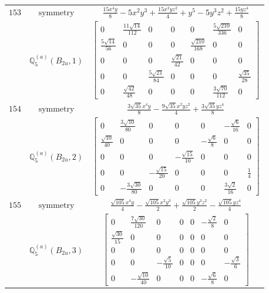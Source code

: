 \documentclass[fleqn,8pt,landscape]{jsarticle}
\begin{document}
\begin{longtable}{ccc}
$ 153 $ & $ \text{symmetry} $ & $ \frac{15 x^{4} y}{8} - 5 x^{2} y^{3} + \frac{15 x^{2} y z^{2}}{4} + y^{5} - 5 y^{3} z^{2} + \frac{15 y z^{4}}{8} $ \\
$  $ & $ \mathbb{Q}_{5}^{(a)}(B_{2u},1) $ & $ \begin{bmatrix} 0 & \frac{11 \sqrt{14}}{112} & 0 & 0 & 0 & \frac{5 \sqrt{210}}{336} & 0 \\ \frac{5 \sqrt{14}}{56} & 0 & 0 & 0 & \frac{\sqrt{210}}{168} & 0 & 0 \\ 0 & 0 & 0 & \frac{\sqrt{21}}{42} & 0 & 0 & 0 \\ 0 & 0 & \frac{5 \sqrt{21}}{84} & 0 & 0 & 0 & \frac{\sqrt{35}}{28} \\ 0 & \frac{\sqrt{42}}{48} & 0 & 0 & 0 & \frac{3 \sqrt{70}}{112} & 0 \end{bmatrix} $ \\ \hline
$ 154 $ & $ \text{symmetry} $ & $ \frac{3 \sqrt{35} x^{4} y}{8} - \frac{9 \sqrt{35} x^{2} y z^{2}}{4} + \frac{3 \sqrt{35} y z^{4}}{8} $ \\
$  $ & $ \mathbb{Q}_{5}^{(a)}(B_{2u},2) $ & $ \begin{bmatrix} 0 & \frac{3 \sqrt{10}}{80} & 0 & 0 & 0 & - \frac{\sqrt{6}}{16} & 0 \\ \frac{\sqrt{10}}{40} & 0 & 0 & 0 & - \frac{\sqrt{6}}{8} & 0 & 0 \\ 0 & 0 & 0 & - \frac{\sqrt{15}}{10} & 0 & 0 & 0 \\ 0 & 0 & - \frac{\sqrt{15}}{20} & 0 & 0 & 0 & \frac{1}{4} \\ 0 & - \frac{3 \sqrt{30}}{80} & 0 & 0 & 0 & \frac{3 \sqrt{2}}{16} & 0 \end{bmatrix} $ \\ \hline
$ 155 $ & $ \text{symmetry} $ & $ \frac{\sqrt{105} x^{4} y}{4} - \frac{\sqrt{105} x^{2} y^{3}}{2} + \frac{\sqrt{105} y^{3} z^{2}}{2} - \frac{\sqrt{105} y z^{4}}{4} $ \\
$  $ & $ \mathbb{Q}_{5}^{(a)}(B_{2u},3) $ & $ \begin{bmatrix} 0 & \frac{7 \sqrt{30}}{120} & 0 & 0 & 0 & - \frac{\sqrt{2}}{8} & 0 \\ \frac{\sqrt{30}}{15} & 0 & 0 & 0 & 0 & 0 & 0 \\ 0 & 0 & 0 & 0 & 0 & 0 & 0 \\ 0 & 0 & - \frac{\sqrt{5}}{10} & 0 & 0 & 0 & - \frac{\sqrt{3}}{6} \\ 0 & - \frac{\sqrt{10}}{40} & 0 & 0 & 0 & - \frac{\sqrt{6}}{8} & 0 \end{bmatrix} $ \\ \hline

\end{longtable}
\end{document}
